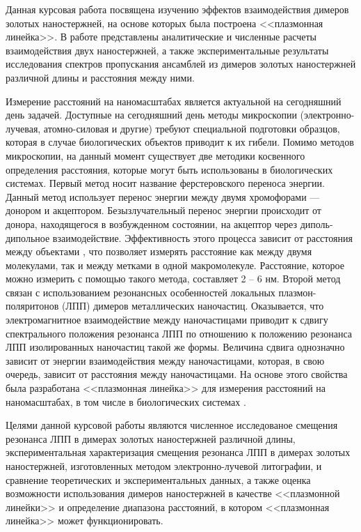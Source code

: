 
Данная курсовая работа посвящена изучению эффектов взаимодействия димеров золотых наностержней, на основе которых была построена <<плазмонная линейка>>. В работе представлены аналитические и численные расчеты взаимодействия двух наностержней, а также экспериментальные результаты исследования спектров пропускания ансамблей из димеров золотых наностержней различной длины и расстояния между ними.

Измерение расстояний на наномасштабах является актуальной на сегодняшний день задачей. Доступные на сегодняшний день методы микроскопии (электронно-лучевая, атомно-силовая и другие) требуют специальной подготовки образцов, которая в случае биологических объектов приводит к их гибели. Помимо методов микроскопии, на данный момент существует две методики косвенного определения расстояния, которые могут быть использованы в биологических системах. Первый метод носит название ферстеровского переноса энергии. Данный метод использует перенос энергии между двумя хромофорами --- донором и акцептором. Безызлучательный перенос энергии происходит от донора, находящегося в возбужденном состоянии, на акцептор через диполь-дипольное взаимодействие. Эффективность этого процесса зависит от расстояния между объектами , что позволяет измерять расстояние как между двумя молекулами, так и между метками в одной макромолекуле. Расстояние, которое можно измерить с помощью такого метода, составляет 2 -- 6 нм. Второй метод связан с использованием резонансных особенностей локальных плазмон-поляритонов (ЛПП) димеров металлических наночастиц. Оказывается, что электромагнитное взаимодействие между наночастицами приводит к сдвигу спектрального положения резонанса ЛПП по отношению к положению резонанса ЛПП изолированных наночастиц такой же формы.  Величина сдвига однозначно зависит от энергии взаимодействия между наночастицами, которая, в свою очередь, зависит от расстояния между наночастицами. На основе этого свойства была разработана <<плазмонная линейка>> для измерения расстояний на наномасштабах, в том числе в биологических системах \cite{DNA}.

Целями данной курсовой работы являются численное исследованое смещения резонанса ЛПП в димерах золотых наностержней различной длины, экспериментальная характеризация смещения резонанса ЛПП в димерах золотых наностержней, изготовленных методом электронно-лучевой литографии, и сравнение теоретических и экспериментальных данных, а также оценка возможности использования димеров наностержней в качестве <<плазмонной линейки>> и определение диапазона расстояний, в котором <<плазмонная линейка>> может функционировать.